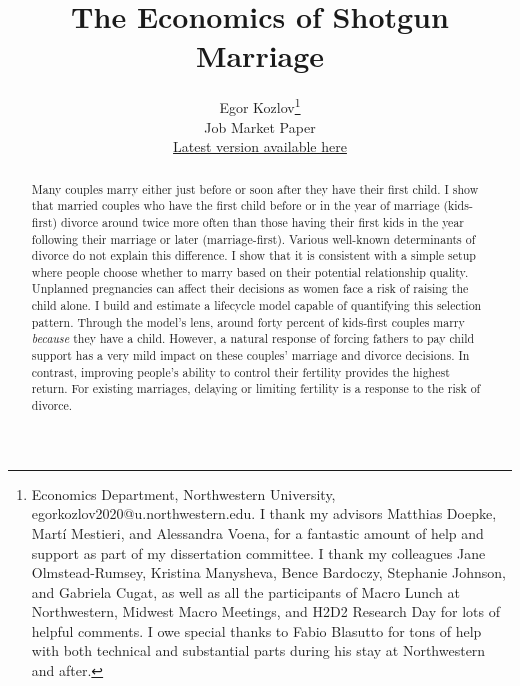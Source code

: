 \documentclass[12pt,letter]{article}
\begin{document}
\title{The Economics of Shotgun Marriage}
\author{Egor Kozlov\thanks{Economics Department, Northwestern University, egorkozlov2020@u.northwestern.edu. I thank my advisors Matthias Doepke, Martí Mestieri, and Alessandra Voena, for a fantastic amount of help and support as part of my dissertation committee. I thank my colleagues Jane Olmstead-Rumsey, Kristina Manysheva, Bence Bardoczy, Stephanie Johnson, and Gabriela Cugat, as well as all the participants of Macro Lunch at Northwestern, Midwest Macro Meetings, and H2D2 Research Day for lots of helpful comments. I owe special thanks to Fabio Blasutto for tons of help with both technical and substantial parts during his stay at Northwestern and after.}\\[1.5cm] Job Market Paper \\ \href{http://egorkozlov.link/jmp-kozlov.pdf}{Latest version available here}}
\maketitle

\begin{abstract}
Many couples marry either just before or soon after they have their first child. I show that married couples who have the first child before or in the year of marriage (kids-first) divorce around twice more often than those having their first kids in the year following their marriage or later (marriage-first). Various well-known determinants of divorce do not explain this difference. I show that it is consistent with a simple setup where people choose whether to marry based on their potential relationship quality. Unplanned pregnancies can affect their decisions as women face a risk of raising the child alone. I build and estimate a lifecycle model capable of quantifying this selection pattern. Through the model's lens, around forty percent of kids-first couples marry \textit{because} they have a child. However, a natural response of forcing fathers to pay child support has a very mild impact on these couples' marriage and divorce decisions. In contrast, improving people's ability to control their fertility provides the highest return. For existing marriages, delaying or limiting fertility is a response to the risk of divorce.
\end{abstract}

\newpage
\end{document}
